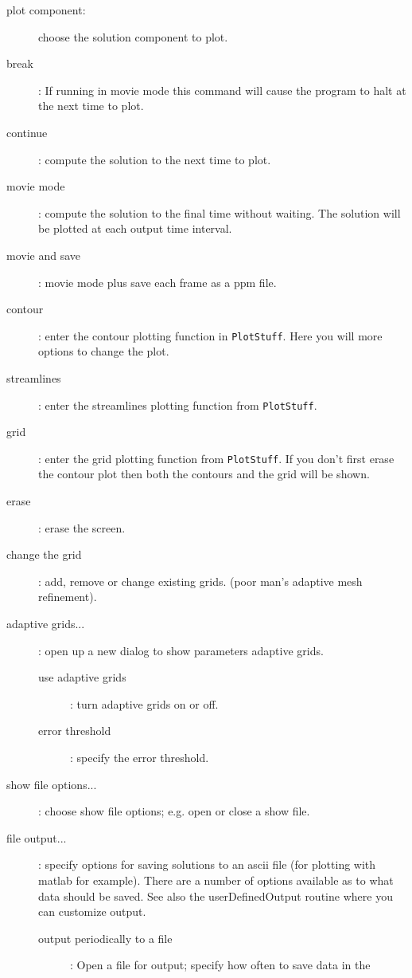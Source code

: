 
 
\newlength{\runTimeMenuIncludeArgIndent}
  \begin{description}
    \item[plot component:] choose the solution component to plot.
    \item[break] : If running in movie mode this command will cause the program to halt at the next
                   time to plot.
    \item[continue] : compute the solution to the next time to plot.
    \item[movie mode] : compute the solution to the final time without waiting. The solution will be
         plotted at each output time interval. 
    \item[movie and save] : movie mode plus save each frame as a ppm file.
    \item[contour] : enter the contour plotting function in {\tt PlotStuff}. Here you will more options
       to change the plot.  
    \item[streamlines] : enter the streamlines plotting function from {\tt PlotStuff}.
    \item[grid] : enter the grid plotting function from {\tt PlotStuff}. If you don't first erase
        the contour plot then both the contours and the grid will be shown.
    \item[erase] : erase the screen.
    \item[change the grid] : add, remove or change existing grids. (poor man's adaptive mesh refinement).
    \item[adaptive grids...] : open up a new dialog to show parameters adaptive grids.
    \begin{description}
       \item[use adaptive grids] : turn adaptive grids on or off.
       \item[error threshold] : specify the error threshold.
    \end{description}
    \item[show file options...] : choose show file options; e.g. open or close a show file.
    \item[file output...] : specify options for saving solutions to an ascii file (for plotting with matlab for example).
        There are a number of options available as to what data should be saved. See also the userDefinedOutput routine
        where you can customize output.
      \begin{description}
         \item[output periodically to a file] : Open a file for output; specify how often to save data in the

\end{description}
\end{description}
